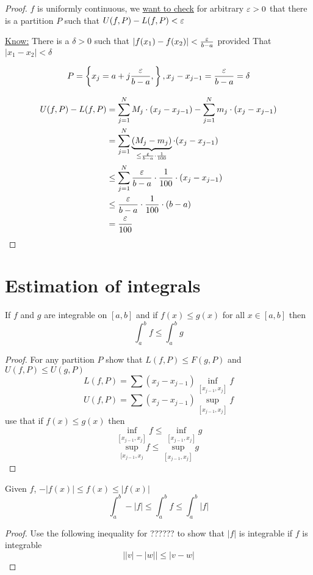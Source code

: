 \begin{proof}
  $f$ is uniformly continuous, we \underline{want to check} for arbitrary $\varepsilon > 0$
  that there is a partition $P$ such that $U(f, P) - L(f, P) < \varepsilon$

  \underline{Know:} There is a $\delta > 0$ such that $|f(x_1) - f(x_2)| < \frac{\varepsilon}{b-a}$ provided That $|x_1 - x_2| < \delta$

  $$P = \left\{x_j = a + j\frac{\varepsilon}{b-a},\right\}, x_j-x_{j-1} = \frac{\varepsilon}{b-a} = \delta$$

  \begin{align*}
    U(f, P) - L(f, P) &= \sum_{j=1}^{N} M_j \cdot (x_j - x_{j-1}) - \sum_{j=1}^{N} m_j \cdot (x_j - x_{j-1})\\
    &= \sum_{j=1}^{N} \underbrace{(M_j - m_j)}_{\leq \frac{\varepsilon}{b-a}\cdot \frac{1}{100}} \cdot (x_j - x_{j-1})\\
    &\leq \sum_{j=1}^{N} \frac{\varepsilon}{b-a}\cdot \frac{1}{100} \cdot (x_j - x_{j-1})\\
    &\leq \frac{\varepsilon}{b-a}\cdot \frac{1}{100} \cdot (b-a)\\
    &= \frac{\varepsilon}{100}
  \end{align*}
\end{proof}

\section{Estimation of integrals}

\begin{theorem*}
  If $f$ and $g$ are integrable on $[a, b]$ and if $f(x) \le g(x)$ for all $x \in [a, b]$ then
  $$\int_a^b f \le \int_a^b g$$
\end{theorem*}

\begin{proof}
  For any partition $P$ show that $L(f, P) \le F(g, P)$ and $U(f, P) \le U(g, P)$
  $$L(f, P) = \sum (x_j - x_{j-1}) \inf_{[x_{j-1}, x_j]} f$$
  $$U(f, P) = \sum (x_j - x_{j-1}) \sup_{[x_{j-1}, x_j]} f$$
  use that if $f(x) \le g(x)$ then 
  $$\inf_{[x_{j-1}, x_j]} f \le \inf_{[x_{j-1}, x_j]} g$$
  $$\sup_{[x_{j-1}, x_j} f \le \sup_{[x_{j-1}, x_j]} g$$
\end{proof}


\begin{theorem*}
  Given $f$, $-|f(x)| \le f(x) \le |f(x)|$
  $$\int_a^b -|f| \le \int_a^b f \le \int_a^b |f|$$
\end{theorem*}

\begin{proof}
  Use the following inequality for ?????? to show that $|f|$ is integrable
  if $f$ is integrable 
  $$\left||v|-|w|\right| \le |v-w|$$
\end{proof}